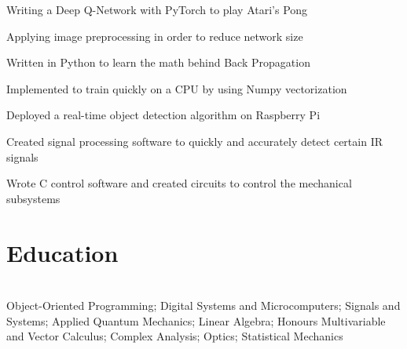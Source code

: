 \documentclass[]{deedy-resume-openfont}
\begin{document}
\begin{tightemize}
    \item Writing a Deep Q-Network with PyTorch to play Atari's Pong
    \item Applying image preprocessing in order to reduce network size
\end{tightemize}

\vspace{8pt}

\begin{tightemize}
    \item Written in Python to learn the math behind Back Propagation 
    \item Implemented to train quickly on a CPU by using Numpy vectorization
\end{tightemize}

\vspace{8pt}

\begin{tightemize}
    \item Deployed a real-time object detection algorithm on Raspberry Pi
    \item Created signal processing software to quickly and accurately detect certain IR signals
    \item Wrote C control software and created circuits to control the mechanical subsystems
\end{tightemize}

\vspace{12pt}


\section{Education}

\begin{adjustwidth}{0.55cm}{1.25cm}
     \\
     Object-Oriented Programming; Digital Systems and Microcomputers; Signals and Systems; Applied Quantum Mechanics; Linear Algebra; Honours Multivariable and Vector Calculus; Complex Analysis; Optics; Statistical Mechanics
\end{adjustwidth}
\vspace{8pt}
\end{document}

